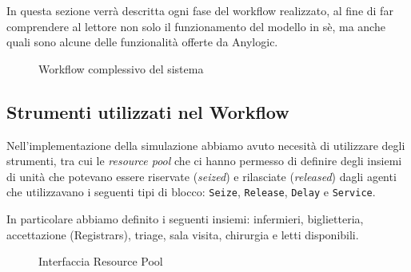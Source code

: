In questa sezione verrà descritta ogni fase del workflow realizzato, al fine di far comprendere al lettore non solo il funzionamento del modello in sè, ma anche quali sono alcune delle funzionalità offerte da Anylogic. 

\begin{figure}[!htb]
    \centering
    \caption{Workflow complessivo del sistema}
    \label{fig:wf-all}
\end{figure}

\clearpage
\subsection{Strumenti utilizzati nel Workflow} \label{chap:param}
Nell’implementazione della simulazione abbiamo avuto necesità di utilizzare degli strumenti, tra cui le \textit{resource pool} che ci hanno permesso di definire degli insiemi di unità che potevano essere riservate (\textit{seized}) e rilasciate (\textit{released}) dagli agenti che utilizzavano i seguenti tipi di blocco: \texttt{Seize}, \texttt{Release}, \texttt{Delay} e \texttt{Service}.

In particolare abbiamo definito i seguenti insiemi: infermieri, biglietteria, accettazione (Registrars), triage, sala visita, chirurgia e letti disponibili.

\begin{figure}[!htb]
    \centering
    \caption{Interfaccia Resource Pool}
\end{figure}

